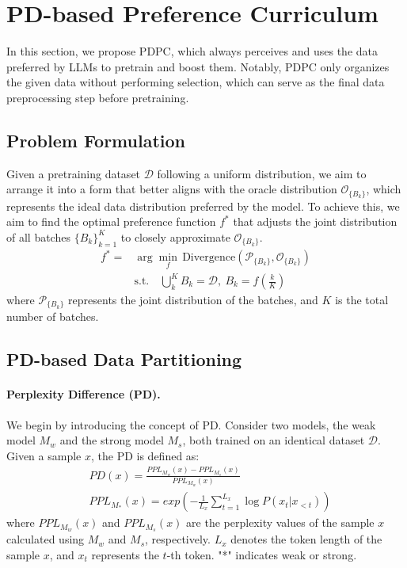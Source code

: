 \documentclass[11pt]{article}
\begin{document}
\section{PD-based Preference Curriculum} 
In this section, we propose PDPC, which always perceives and uses the data preferred by LLMs to pretrain and boost them. Notably, PDPC only organizes the given data without performing selection, which can serve as the final data preprocessing step before pretraining.

\subsection{Problem Formulation} \label{subsec:probdef}
Given a pretraining dataset \(\mathcal{D}\) following a uniform distribution, we aim to arrange it into a form that better aligns with the oracle distribution \(\mathcal{O}_{\{B_k\}}\), which represents the ideal data distribution preferred by the model. To achieve this, we aim to find the optimal preference function \(f^*\) that adjusts the joint distribution of all batches \(\{B_k\}_{k=1}^K\) to closely approximate \(\mathcal{O}_{\{B_k\}}\).
\begin{equation}
\begin{aligned}
f^* = & \arg\min_{f} \,  \text{Divergence}\left(\mathcal{P}_{\{B_k\}}, \mathcal{O}_{\{B_k\}}\right) \\
&\text{s.t.} \quad  \bigcup_{k}^K B_k = \mathcal{D}, ~ B_k = f\left(\frac{k}{K}\right)
\end{aligned}
\end{equation}
where \(\mathcal{P}_{\{B_k\}}\) represents the joint distribution of the batches, and \(K\) is the total number of batches.

\subsection{PD-based Data Partitioning}
\paragraph{Perplexity Difference (PD).} We begin by introducing the concept of PD. Consider two models, the weak model $M_w$ and the strong model $M_s$, both trained on an identical dataset $\mathcal{D}$. Given a sample \( x \), the PD is defined as:
\begin{equation}
\begin{aligned}
    &PD(x) = \frac{PPL_{M_w}(x) - PPL_{M_s}(x)}{PPL_{M_w}(x)} \\
    &PPL_{M_{*}}(x) = exp{(-\frac{1}{L_x}\sum_{t=1}^{L_x}\log P(x_t|x_{<t}))}
\end{aligned}
\end{equation}
where \( PPL_{M_w}(x) \) and \( PPL_{M_s}(x) \) are the perplexity values of the sample \( x \) calculated using \( M_w \) and \( M_s \), respectively. \( L_x \) denotes the token length of the sample \( x \), and \( x_t \) represents the \( t \)-th token. "*" indicates weak or strong. 
\end{document}
